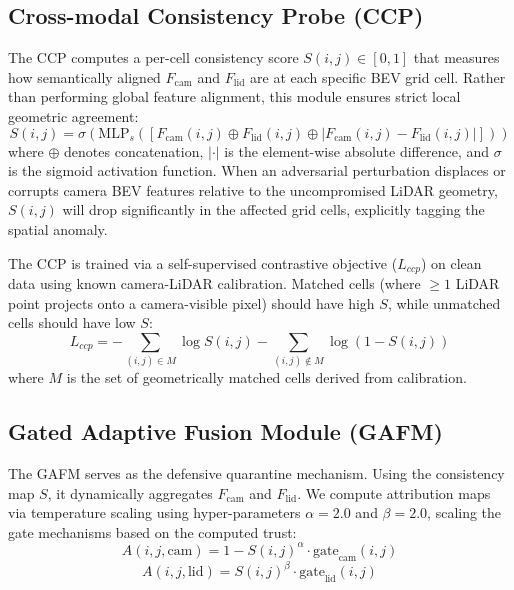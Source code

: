 \subsection{Cross-modal Consistency Probe (CCP)}
The CCP computes a per-cell consistency score $S(i,j) \in [0,1]$ that measures how semantically aligned $F_{\text{cam}}$ and $F_{\text{lid}}$ are at each specific BEV grid cell. Rather than performing global feature alignment, this module ensures strict local geometric agreement:
\begin{equation}
S(i,j) = \sigma\left( \text{MLP}_s\left( \left[F_{\text{cam}}(i,j) \oplus F_{\text{lid}}(i,j) \oplus |F_{\text{cam}}(i,j) - F_{\text{lid}}(i,j)|\right] \right) \right)
\end{equation}
where $\oplus$ denotes concatenation, $|\cdot|$ is the element-wise absolute difference, and $\sigma$ is the sigmoid activation function. When an adversarial perturbation displaces or corrupts camera BEV features relative to the uncompromised LiDAR geometry, $S(i,j)$ will drop significantly in the affected grid cells, explicitly tagging the spatial anomaly.

The CCP is trained via a self-supervised contrastive objective ($L_{ccp}$) on clean data using known camera-LiDAR calibration. Matched cells (where $\ge 1$ LiDAR point projects onto a camera-visible pixel) should have high $S$, while unmatched cells should have low $S$:
\begin{equation}
L_{ccp} = - \sum_{(i,j)\in M} \log S(i,j) - \sum_{(i,j)\notin M} \log(1 - S(i,j))
\end{equation}
where $M$ is the set of geometrically matched cells derived from calibration.

\subsection{Gated Adaptive Fusion Module (GAFM)}
The GAFM serves as the defensive quarantine mechanism. Using the consistency map $S$, it dynamically aggregates $F_{\text{cam}}$ and $F_{\text{lid}}$. We compute attribution maps via temperature scaling using hyper-parameters $\alpha=2.0$ and $\beta=2.0$, scaling the gate mechanisms based on the computed trust:
\begin{equation}
A(i,j,\text{cam}) = 1 - S(i,j)^\alpha  \cdot  \text{gate}_{\text{cam}}(i,j)
\end{equation}
\begin{equation}
A(i,j,\text{lid}) = S(i,j)^\beta  \cdot  \text{gate}_{\text{lid}}(i,j)
\end{equation}

